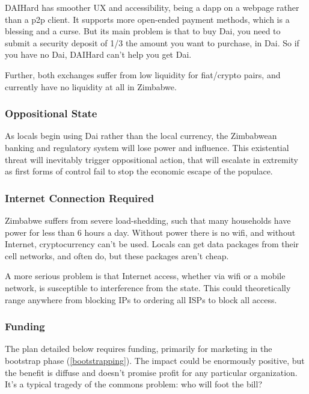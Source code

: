 \documentclass{article}
\begin{document}
DAIHard has smoother UX and accessibility, being a dapp on a webpage rather than a p2p client. It supports more open-ended payment methods, which is a blessing and a curse. But its main problem is that to buy Dai, you need to submit a security deposit of 1/3 the amount you want to purchase, in Dai. So if you have no Dai, DAIHard can't help you get Dai.

Further, both exchanges suffer from low liquidity for fiat/crypto pairs, and currently have no liquidity at all in Zimbabwe.

\subsubsection{Oppositional State} \label{oppositional state}

As locals begin using Dai rather than the local currency, the Zimbabwean banking and regulatory system will lose power and influence. This existential threat will inevitably trigger oppositional action, that will escalate in extremity as first forms of control fail to stop the economic escape of the populace.

\subsubsection{Internet Connection Required} \label{internet required}

Zimbabwe suffers from severe load-shedding, such that many households have power for less than 6 hours a day. Without power there is no wifi, and without Internet, cryptocurrency can't be used. Locals can get data packages from their cell networks, and often do, but these packages aren't cheap.

A more serious problem is that Internet access, whether via wifi or a mobile network, is susceptible to interference from the state. This could theoretically range anywhere from blocking IPs to ordering all ISPs to block all access.

\subsubsection{Funding} \label{funding}

The plan detailed below requires funding, primarily for marketing in the bootstrap phase (\ref{bootstrapping}). The impact could be enormously positive, but the benefit is diffuse and doesn't promise profit for any particular organization. It's a typical tragedy of the commons problem: who will foot the bill?
\end{document}
